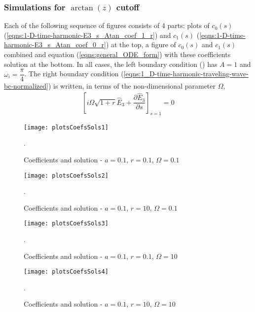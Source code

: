 \documentclass[12pt,twoside]{article}
\begin{document}
  
\newpage

\subsubsection{Simulations for $\arctan(z)$ cutoff}

Each of the following sequence of figures consists of 4 parts: plots of $c_0(s)$ (\ref{eqns:1-D-time-harmonic-E3_s_Atan_coef_1_r}) and $c_1(s)$ (\ref{eqns:1-D-time-harmonic-E3_s_Atan_coef_0_r}) at the top, a figure of $c_0(s)$ and $c_1(s)$ combined and equation (\ref{eqns:general_ODE_form}) with these coefficients solution at the bottom. In all cases, the left boundary condition () has $A=1$ and $\omega_i=\dfrac{\pi}{4}$.  The right boundary condition (\ref{eqns:1_D-time-harmonic-traveling-wave-bc-normalized}) is written, in terms of the non-dimensional parameter $\Omega$, 
\begin{align}
\label{eqns:1_D-time-harmonic-traveling-wave-bc-non-dim}
\left[i \Omega \sqrt{1+r}\hat{E}_3 + \dfrac{\partial \hat{E}_3}{\partial s} \right]_{s=1}=0
\end{align}

\begin{figure} 
\begin{center}
\texttt{[image: plotsCoefsSols1]}
\end{center}
\caption {Coefficients and solution - $a = 0.1$, $r = 0.1$, $\Omega = 0.1$}.

\label{fig:atanCoefsPlots1}
\end{figure}

\begin{figure} 
\begin{center}
\texttt{[image: plotsCoefsSols2]}
\end{center}
\caption {Coefficients and solution - $a = 0.1$, $r = 10$, $\Omega = 0.1$}.

\label{fig:atanCoefsPlots2}
\end{figure}

\begin{figure} 
\begin{center}
\texttt{[image: plotsCoefsSols3]}
\end{center}
\caption {Coefficients and solution - $a = 0.1$, $r = 0.1$, $\Omega = 10$}.

\label{fig:atanCoefsPlots3}
\end{figure}

\begin{figure} 
\begin{center}
\texttt{[image: plotsCoefsSols4]}
\end{center}
\caption {Coefficients and solution - $a = 0.1$, $r = 10$, $\Omega = 10$}.

\label{fig:atanCoefsPlots4}
\end{figure}
\end{document}
